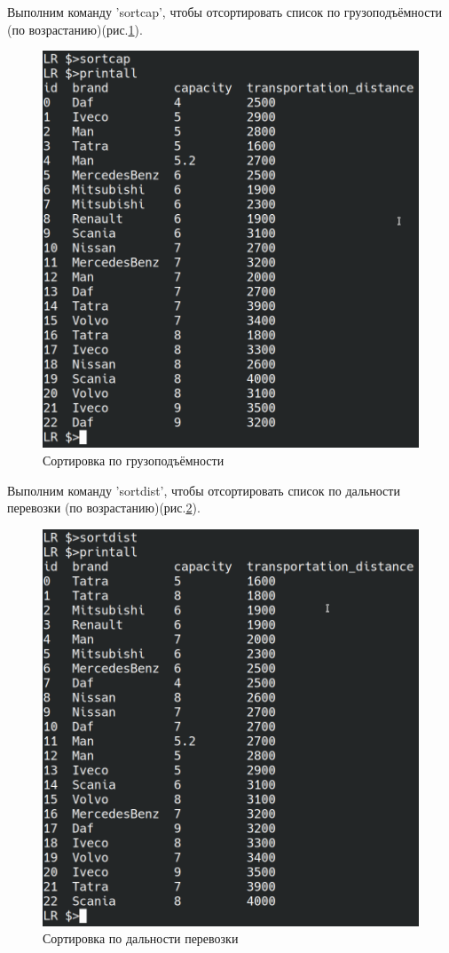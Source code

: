 Выполним команду 'sortcap', чтобы отсортировать 
список по грузоподъёмности (по возрастанию)(рис.\ref{test.sortcap}).

\begin{figure}[H]
    \centering
    \includegraphics[width=0.9\linewidth]{photo/test.sortcap}
    \caption{Сортировка по грузоподъёмности}
    \label{test.sortcap}
\end{figure}

Выполним команду 'sortdist', чтобы отсортировать 
список по дальности перевозки (по возрастанию)(рис.\ref{test.sortdist}).

\begin{figure}[H]
    \centering
    \includegraphics[width=0.9\linewidth]{photo/test.sortdist}
    \caption{Сортировка по дальности перевозки}
    \label{test.sortdist}
\end{figure}

